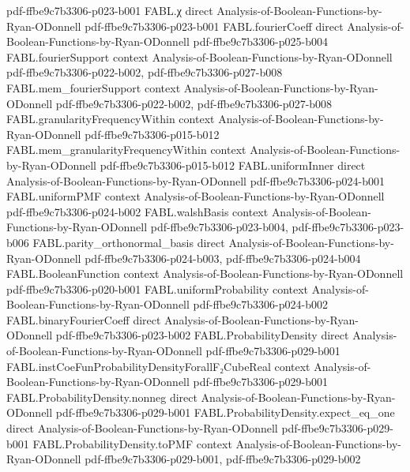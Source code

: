 \begin{theorem}
{    pdf-ffbe9c7b3306-p023-b001}
\proofstep
  {FABL.χ}
  {direct}
  {Analysis-of-Boolean-Functions-by-Ryan-ODonnell}
  {pdf-ffbe9c7b3306-p023-b001}
\proofstep
  {FABL.fourierCoeff}
  {direct}
  {Analysis-of-Boolean-Functions-by-Ryan-ODonnell}
  {pdf-ffbe9c7b3306-p025-b004}
\proofstep
  {FABL.fourierSupport}
  {context}
  {Analysis-of-Boolean-Functions-by-Ryan-ODonnell}
  {pdf-ffbe9c7b3306-p022-b002,
    pdf-ffbe9c7b3306-p027-b008}
\proofstep
  {FABL.mem_fourierSupport}
  {context}
  {Analysis-of-Boolean-Functions-by-Ryan-ODonnell}
  {pdf-ffbe9c7b3306-p022-b002,
    pdf-ffbe9c7b3306-p027-b008}
\proofstep
  {FABL.granularityFrequencyWithin}
  {context}
  {Analysis-of-Boolean-Functions-by-Ryan-ODonnell}
  {pdf-ffbe9c7b3306-p015-b012}
\proofstep
  {FABL.mem_granularityFrequencyWithin}
  {context}
  {Analysis-of-Boolean-Functions-by-Ryan-ODonnell}
  {pdf-ffbe9c7b3306-p015-b012}
\proofstep
  {FABL.uniformInner}
  {direct}
  {Analysis-of-Boolean-Functions-by-Ryan-ODonnell}
  {pdf-ffbe9c7b3306-p024-b001}
\proofstep
  {FABL.uniformPMF}
  {context}
  {Analysis-of-Boolean-Functions-by-Ryan-ODonnell}
  {pdf-ffbe9c7b3306-p024-b002}
\proofstep
  {FABL.walshBasis}
  {context}
  {Analysis-of-Boolean-Functions-by-Ryan-ODonnell}
  {pdf-ffbe9c7b3306-p023-b004,
    pdf-ffbe9c7b3306-p023-b006}
\proofstep
  {FABL.parity_orthonormal_basis}
  {direct}
  {Analysis-of-Boolean-Functions-by-Ryan-ODonnell}
  {pdf-ffbe9c7b3306-p024-b003,
    pdf-ffbe9c7b3306-p024-b004}
\proofstep
  {FABL.BooleanFunction}
  {context}
  {Analysis-of-Boolean-Functions-by-Ryan-ODonnell}
  {pdf-ffbe9c7b3306-p020-b001}
\proofstep
  {FABL.uniformProbability}
  {context}
  {Analysis-of-Boolean-Functions-by-Ryan-ODonnell}
  {pdf-ffbe9c7b3306-p024-b002}
\proofstep
  {FABL.binaryFourierCoeff}
  {direct}
  {Analysis-of-Boolean-Functions-by-Ryan-ODonnell}
  {pdf-ffbe9c7b3306-p023-b002}
\proofstep
  {FABL.ProbabilityDensity}
  {direct}
  {Analysis-of-Boolean-Functions-by-Ryan-ODonnell}
  {pdf-ffbe9c7b3306-p029-b001}
\proofstep
  {FABL.instCoeFunProbabilityDensityForallF₂CubeReal}
  {context}
  {Analysis-of-Boolean-Functions-by-Ryan-ODonnell}
  {pdf-ffbe9c7b3306-p029-b001}
\proofstep
  {FABL.ProbabilityDensity.nonneg}
  {direct}
  {Analysis-of-Boolean-Functions-by-Ryan-ODonnell}
  {pdf-ffbe9c7b3306-p029-b001}
\proofstep
  {FABL.ProbabilityDensity.expect_eq_one}
  {direct}
  {Analysis-of-Boolean-Functions-by-Ryan-ODonnell}
  {pdf-ffbe9c7b3306-p029-b001}
\proofstep
  {FABL.ProbabilityDensity.toPMF}
  {context}
  {Analysis-of-Boolean-Functions-by-Ryan-ODonnell}
  {pdf-ffbe9c7b3306-p029-b001,
    pdf-ffbe9c7b3306-p029-b002}

\end{theorem}
